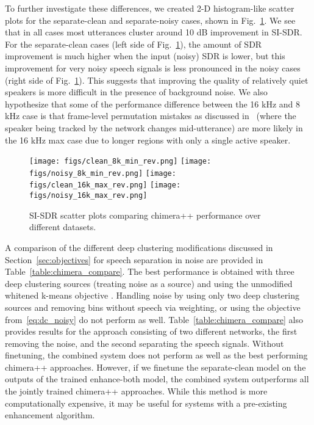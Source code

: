 \documentclass[a4paper]{article}
\begin{document}
To further investigate these differences, we created 2-D histogram-like scatter plots for the separate-clean and separate-noisy cases, shown in Fig.~\ref{fig:scatter}.  We see that in all cases most utterances cluster around 10 dB improvement in SI-SDR.  For the separate-clean cases (left side of Fig.~\ref{fig:scatter}), the amount of SDR improvement is much higher when the input (noisy) SDR is lower, but this improvement for very noisy speech signals is less pronounced in the noisy cases (right side of Fig.~\ref{fig:scatter}).  This suggests that improving the quality of relatively quiet speakers is more difficult in the presence of background noise.  We also hypothesize that some of the performance difference between the 16 kHz and 8 kHz case is that frame-level permutation mistakes as discussed in~\cite{aihara2019teacher} (where the speaker being tracked by the network changes mid-utterance) are more likely in the 16 kHz max case due to longer regions with only a single active speaker.
\begin{figure}[h]
	\centering
		\texttt{[image: figs/clean\_8k\_min\_rev.png]}
		\texttt{[image: figs/noisy\_8k\_min\_rev.png]}
		\texttt{[image: figs/clean\_16k\_max\_rev.png]}
		\texttt{[image: figs/noisy\_16k\_max\_rev.png]}
	\caption{SI-SDR scatter plots comparing chimera++ performance over different datasets.} 
	\label{fig:scatter}
\end{figure}

 
A comparison of the different deep clustering modifications discussed in Section~\ref{sec:objectives} for speech separation in noise are provided in Table~\ref{table:chimera_compare}.  The best performance is obtained with three deep clustering sources (treating noise as a source) and using the unmodified whitened k-means objective .  Handling noise by using only two deep clustering sources and removing bins without speech via weighting, or using the  objective from~\eqref{eq:dc_noisy} do not perform as well.  Table~\ref{table:chimera_compare} also provides results for the approach consisting of two different networks, the first removing the noise, and the second separating the speech signals. Without finetuning, the combined system does not perform as well as the best performing chimera++ approaches. However, if we finetune the separate-clean model on the outputs of the trained enhance-both model, the combined system outperforms all the jointly trained chimera++ approaches.  While this method is more computationally expensive, it may be useful for systems with a pre-existing enhancement algorithm.
\end{document}
